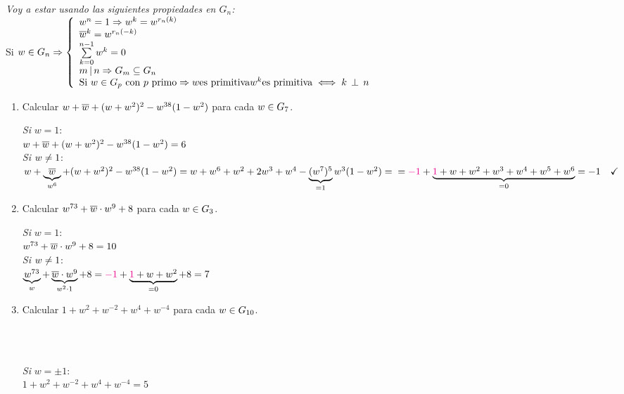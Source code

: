 \documentclass[12pt,a4paper, spanish]{article}
\begin{document}
\ejercicio
\textit{Voy a estar usando las siguientes propiedades en $G_n$: }\\
Si $w \en G_n \entonces
	\llave{l}{
		w^n = 1 \entonces w^k = w^{r_n(k)}\\
		\conj w^k = w^{r_n(-k)} \\
		\sumatoria{k=0}{n-1}w^k = 0\\
		m \divideA n \entonces G_m \subseteq G_n\\
		\text{Si } w \en G_p \text{ con $p$ primo} \entonces w \text{es primitiva}
		w^k \text{es primitiva} \sisolosi k \cop n
	}$\\
\begin{enumerate}[label=\roman*)]
	\item Calcular $w + \conj w + (w + w^2)^2 - w^{38}(1 - w^2)$ para cada $w \en G_7$.

	      \separadorCorto
	      \textit{Si} $w = 1$: \\
	      $w + \conj w + (w + w^2)^2 - w^{38}(1 - w^2) = 6$\\

	      \textit{Si} $w \distinto 1$: \\
	      $w + \ub{\conj w}{w^6} + (w + w^2)^2 - w^{38}(1 - w^2) =
		      w + w^6 + w^2 + 2w^3 + w^4 - \ub{(w^7)^5}{=1} w^3(1 - w^2) =\\
		      =  \magenta{$-1$} + \ub{\magenta{1} + w + w^2 + w^3 + w^4 + w^5 + w^6}{=0} = -1 \Tilde$

	\item Calcular $w^{73} + \conj w \cdot w^9 + 8$ para cada $w\en G_3$.

	      \separadorCorto
	      \textit{Si} $w = 1$: \\
	      $w^{73} + \conj w \cdot w^9 + 8 = 10 $\\

	      \textit{Si} $w \distinto 1$: \\
	      $\ub{w^{73}}{w} + \ub{\conj w \cdot w^9 }{w^2 \cdot 1}+ 8 =
		      \magenta{$-1$} + \ub{\magenta{1} + w + w^2}{= 0} + 8 = 7 $

	\item Calcular $1 + w^2 + w^{-2} + w^4 + w^{-4}$ para cada $w\en G_{10}$.

	      \separadorCorto
	      \\
	      \\

	      \begin{minipage}{0.65\textwidth}
		      \textit{Si} $w = \pm1$: \\
		      $1 + w^2 + w^{-2} + w^4 + w^{-4} = 5$\\


\end{minipage}
\end{enumerate}
\end{document}
